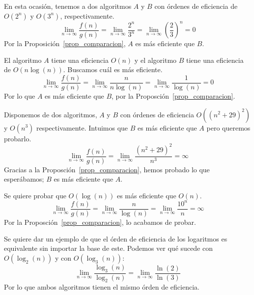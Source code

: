 \begin{ejemplo}
En esta ocasión, tenemos a dos algoritmos $A$ y $B$ con órdenes de eficiencia de $O(2^n)$ y $O(3^n)$, respectivamente.
\begin{equation*}
\lim_{n\to\infty}\dfrac{f(n)}{g(n)} = \lim_{n\to\infty}\dfrac{2^n}{3^n}=\lim_{n\to\infty}\left(\dfrac{2}{3}\right)^n = 0
\end{equation*}
Por la Proposición~\ref{prop_comparacion}, $A$ es más eficiente que $B$.
\end{ejemplo}

\begin{ejemplo}
El algoritmo $A$ tiene una eficiencia $O(n)$ y el algoritmo $B$ tiene una eficiencia de $O(n\log(n))$. Buscamos cuál es más eficiente.
\begin{equation*}
\lim_{n\to\infty}\dfrac{f(n)}{g(n)}=\lim_{n\to\infty}\dfrac{n}{n\log(n)}=\lim_{n\to\infty}\dfrac{1}{\log(n)} = 0
\end{equation*}
Por lo que $A$ es más eficiente que $B$, por la Proposción~\ref{prop_comparacion}.
\end{ejemplo}

\begin{ejemplo}
Disponemos de dos algoritmos, $A$ y $B$ con órdenes de eficiencia $O((n^2+29)^2)$ y $O(n^3)$ respectivamente. Intuimos que $B$ es más eficiente que $A$ pero queremos probarlo.
\begin{equation*}
\lim_{n\to\infty}\dfrac{f(n)}{g(n)} = \lim_{n\to\infty}\dfrac{(n^2+29)^2}{n^3} = \infty
\end{equation*}
Gracias a la Proposción~\ref{prop_comparacion}, hemos probado lo que esperábamos; $B$ es más eficiente que $A$.
\end{ejemplo}

\begin{ejemplo}
Se quiere probar que $O(\log(n))$ es más eficiente que $O(n)$.
\begin{equation*}
\lim_{n\to\infty}\dfrac{f(n)}{g(n)} = \lim_{n\to\infty}\dfrac{n}{\log(n)} = \lim_{n\to\infty}\dfrac{10^n}{n} = \infty
\end{equation*}
Por la Proposción~\ref{prop_comparacion}, lo acabamos de probar.
\end{ejemplo}

\begin{ejemplo}
Se quiere dar un ejemplo de que el órden de eficiencia de los logaritmos es equivalente sin importar la base de este. Podemos ver qué sucede con $O(\log_2(n))$ y con $O(\log_3(n))$:
\begin{equation*}
\lim_{n\to\infty}\dfrac{\log_3(n)}{\log_2(n)} = \lim_{n\to\infty}\dfrac{\ln(2)}{\ln(3)}
\end{equation*}
Por lo que ambos algoritmos tienen el mismo órden de eficiencia.
\end{ejemplo}

